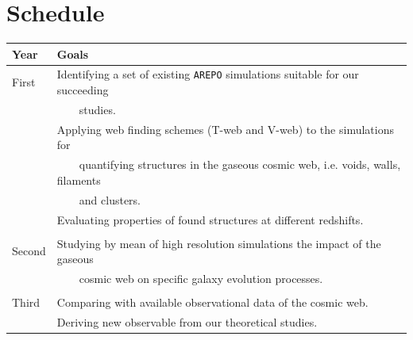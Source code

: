 \documentclass[a4,useAMS,usenatbib,usegraphicx,12pt]{article}
\begin{document}
\section{Schedule}

\begin{table}[h]
\begin{flushleft}
\begin{center}
  \begin{tabular}{l  l} \hline\hline
	\centering\textbf{Year} & \textbf{Goals} \\ \hline
	First  
	& \tabitem Identifying a set of existing \texttt{AREPO} simulations suitable 
	for our succeeding \\
	& \ \ \ \ studies. \\
	& \tabitem Applying web finding schemes (T-web and V-web) to the simulations 
	for\\
	& \ \ \ \ quantifying structures in the gaseous cosmic web, i.e. voids, walls, 
	filaments\\
	& \ \ \ \ and clusters.\\
	& \tabitem Evaluating properties of found structures at different redshifts.\\
	\\
	Second
	& \tabitem Studying by mean of high resolution simulations the impact of the 
	gaseous\\
	& \ \ \ \ cosmic web on specific galaxy evolution processes.\\
	\\	
	Third
	& \tabitem Comparing with available observational data of the cosmic web.\\
	& \tabitem Deriving new observable from our theoretical studies.\\ 
	
	\hline\hline
  \end{tabular}  
\end{center}
\end{flushleft}
\end{table}



\renewcommand{\bibname}{8\ \ \ \ Bibliography}
\small

\end{document}

